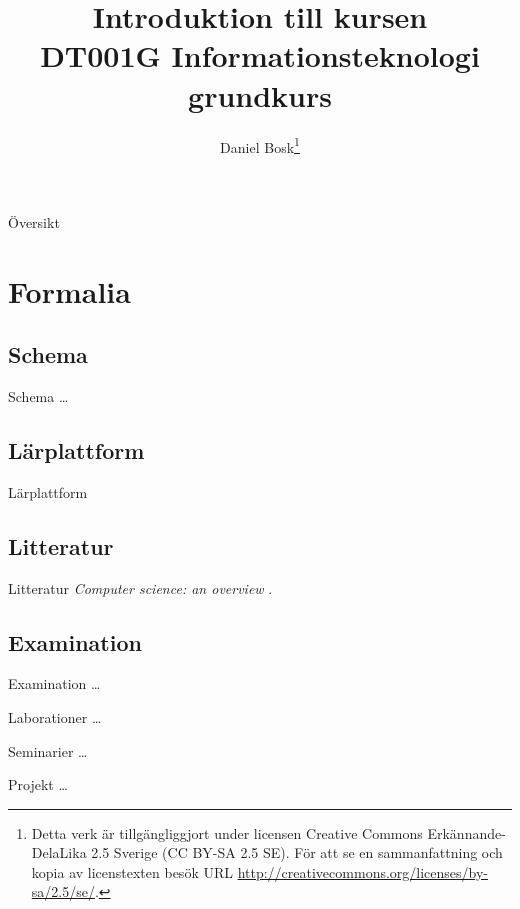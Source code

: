 \documentclass{beamer}
\title[Introduktion]{%
	Introduktion till kursen\\
	DT001G Informationsteknologi grundkurs
}
\author{Daniel Bosk\footnote{%
	\tiny
	Detta verk är tillgängliggjort under licensen Creative Commons 
	Erkännande-DelaLika 2.5 Sverige (CC BY-SA 2.5 SE).
	För att se en sammanfattning och kopia av licenstexten besök URL 
	\url{http://creativecommons.org/licenses/by-sa/2.5/se/}.
}}
\institute[MIUN ITM]{%
	Institutionen för informationsteknologi och medier (ITM),\\
	Mittuniversitetet, Sundsvall.
}
\date{\svnId}
\begin{document}
\begin{frame}
  \titlepage
\end{frame}

\begin{frame}{Översikt}
	\tableofcontents
\end{frame}





\section{Formalia}

\subsection{Schema}
\begin{frame}{Schema}
	\dots
\end{frame}

\subsection{Lärplattform}
\begin{frame}{Lärplattform}
\end{frame}

\subsection{Litteratur}
\begin{frame}{Litteratur}
	\emph{Computer science: an overview} \cite{Brookshear2012csa}.
\end{frame}

\subsection{Examination}
\begin{frame}{Examination}
	\dots
\end{frame}
\begin{frame}{Laborationer}
	\dots
\end{frame}
\begin{frame}{Seminarier}
	\dots
\end{frame}
\begin{frame}{Projekt}
	\dots
\end{frame}
\end{document}
